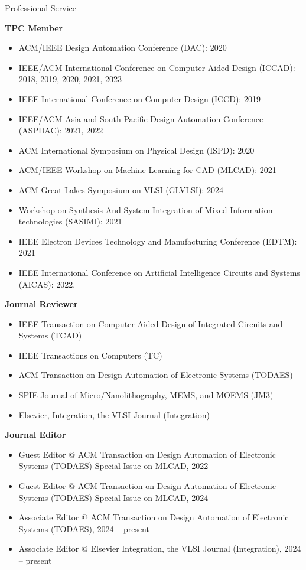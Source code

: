 
\begin{rSection}{Professional Service}

\textbf{TPC Member}
\begin{itemize}
    \item ACM/IEEE Design Automation Conference (DAC): 2020
    \item IEEE/ACM International Conference on Computer-Aided Design (ICCAD): 2018, 2019, 2020, 2021, 2023
    \item IEEE International Conference on Computer Design (ICCD): 2019
    \item IEEE/ACM Asia and South Pacific Design Automation Conference (ASPDAC): 2021, 2022
    \item ACM International Symposium on Physical Design (ISPD): 2020
    \item ACM/IEEE Workshop on Machine Learning for CAD (MLCAD): 2021
    \item ACM Great Lakes Symposium on VLSI (GLVLSI): 2024
    \item Workshop on Synthesis And System Integration of Mixed Information technologies (SASIMI): 2021
    \item IEEE Electron Devices Technology and Manufacturing Conference (EDTM): 2021
    \item IEEE International Conference on Artificial Intelligence Circuits and Systems (AICAS): 2022. 
\end{itemize}

\textbf{Journal Reviewer}
\begin{itemize}
    \item IEEE Transaction on Computer-Aided Design of Integrated Circuits and Systems (TCAD)
    \item IEEE Transactions on Computers (TC)
    \item ACM Transaction on Design Automation of Electronic Systems (TODAES)
    \item SPIE Journal of Micro/Nanolithography, MEMS, and MOEMS (JM3)
    \item Elsevier, Integration, the VLSI Journal (Integration)
\end{itemize}

\textbf{Journal Editor}
\begin{itemize}
    \item Guest Editor @ ACM Transaction on Design Automation of Electronic Systems (TODAES) Special Issue on MLCAD, 2022
    \item Guest Editor @ ACM Transaction on Design Automation of Electronic Systems (TODAES) Special Issue on MLCAD, 2024
    \item Associate Editor @ ACM Transaction on Design Automation of Electronic Systems (TODAES), 2024 -- present
    \item Associate Editor @ Elsevier Integration, the VLSI Journal (Integration), 2024 -- present
\end{itemize}


\end{rSection}
